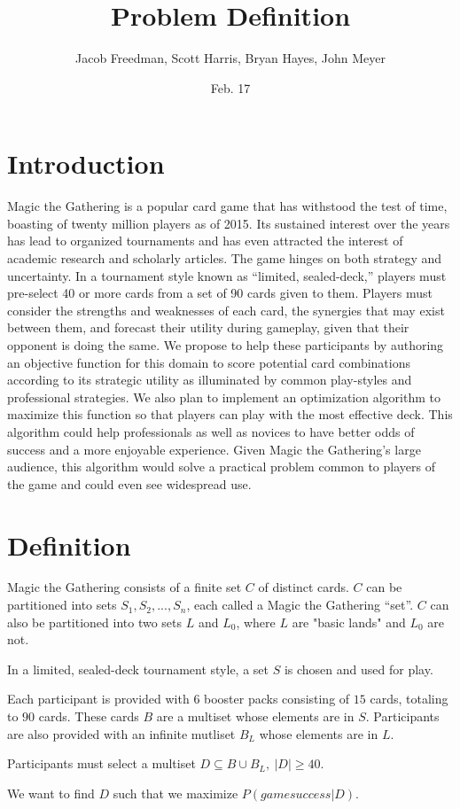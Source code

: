 \documentclass[12pt,letterpaper]{report}
\title{Problem Definition}
\date{Feb. 17}
\author{Jacob Freedman, Scott Harris, Bryan Hayes, John Meyer}
\begin{document}
\maketitle

\section{Introduction}

Magic the Gathering is a popular card game that has withstood the test of time,
boasting of twenty million players as of 2015.
Its sustained interest over the years has lead to organized tournaments
and has even attracted the interest of academic research and scholarly articles.
The game hinges on both strategy and uncertainty.
In a tournament style known as \enquote{limited, sealed-deck,}
players must pre-select 40 or more cards from a set of 90 cards given to them.
Players must consider the strengths and weaknesses of each card,
the synergies that may exist between them,
and forecast their utility during gameplay,
given that their opponent is doing the same.
We propose to help these participants by authoring an objective function for this
domain to score potential card combinations according to its strategic utility
as illuminated by common play-styles and professional strategies.
We also plan to implement an optimization algorithm to maximize this function
so that players can play with the most effective deck.
This algorithm could help professionals as well as novices to have better odds of success
and a more enjoyable experience.
Given Magic the Gathering’s large audience,
this algorithm would solve a practical problem common to players of the game
and could even see widespread use.

\section{Definition}

Magic the Gathering consists of a finite set $ C $ of distinct cards.
$ C $ can be partitioned into sets $ S_1, S_2, ..., S_n $, each called a Magic the Gathering \enquote{set}.
$ C $ can also be partitioned into two sets $ L $ and $ L_0 $, where $ L $ are "basic lands" and $ L_0 $ are not.

In a limited, sealed-deck tournament style,
a set $ S $ is chosen and used for play.

Each participant is provided with 6 booster packs consisting of $ 15 $ cards, totaling to $ 90 $ cards.
These cards $ B $ are a multiset whose elements are in $ S $.
Participants are also provided with an infinite mutliset $ B_L $ whose elements are in $ L $.

Participants must select a multiset $ D \subseteq B \cup B_L , \ |D| \ge 40 $.

We want to find $ D $ such that we maximize $ P(game success | D) $.
\end{document}
